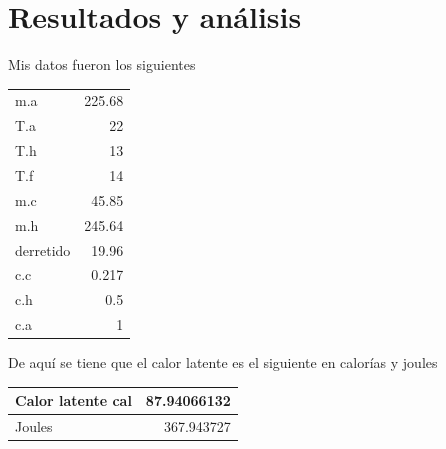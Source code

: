 \documentclass[article,12pt]{elsarticle}
\begin{document}
\newpage
\section{Resultados y análisis}

Mis datos fueron los siguientes \\

\begin{table}[h]
\begin{tabular}{lr}
m.a          & 225.68 \\
T.a            & 22     \\
T.h            & 13     \\
T.f             & 14     \\
m.c        & 45.85  \\
m.h         & 245.64 \\
derretido & 19.96  \\
c.c         & 0.217  \\
c.h         & 0.5    \\
c.a          & 1     
\end{tabular}
\end{table}

De aquí se tiene que el calor latente es el siguiente en calorías y joules \\

\begin{table}[h]
\begin{tabular}{|l|r|}
\hline
Calor latente cal & 87.94066132 \\ \hline
Joules            & 367.943727  \\ \hline
\end{tabular}
\end{table}
\end{document}
